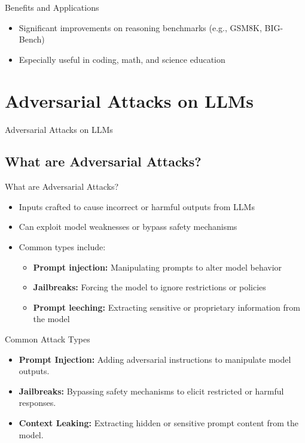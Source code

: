 \begin{frame}{Benefits and Applications}
    \begin{itemize}
        \setlength{\itemsep}{1em}
        \item Significant improvements on reasoning benchmarks (e.g., GSM8K, BIG-Bench)
        \item Especially useful in coding, math, and science education
    \end{itemize}
\end{frame}


\section{Adversarial Attacks on LLMs}
\begin{frame}{}
    \LARGE  Adversarial Attacks on LLMs
\end{frame}


\subsection{What are Adversarial Attacks?}
\begin{frame}{What are Adversarial Attacks?}
    \begin{itemize}
        \setlength{\itemsep}{1em}
        \item Inputs crafted to cause incorrect or harmful outputs from LLMs
        \item Can exploit model weaknesses or bypass safety mechanisms
        \item Common types include:
        \begin{itemize}
            \setlength{\itemsep}{0.75em}
            \item \textbf{Prompt injection:} Manipulating prompts to alter model behavior
            \item \textbf{Jailbreaks:} Forcing the model to ignore restrictions or policies
            \item \textbf{Prompt leeching:} Extracting sensitive or proprietary information from the model
        \end{itemize}
    \end{itemize}
\end{frame}


\begin{frame}{Common Attack Types}
    \begin{itemize}
        \setlength{\itemsep}{1em}
        \item \textbf{Prompt Injection:} Adding adversarial instructions to manipulate model outputs.
        \item \textbf{Jailbreaks:} Bypassing safety mechanisms to elicit restricted or harmful responses.
        \item \textbf{Context Leaking:} Extracting hidden or sensitive prompt content from the model.
    \end{itemize}
\end{frame}


